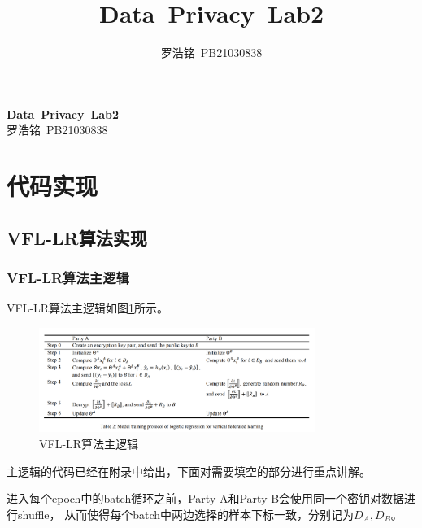 \documentclass[twoside,11pt]{article}
\title{Data\ Privacy\ Lab2}
\author{罗浩铭\ PB21030838}
\begin{document}
\fancyhf{} %
\fancyfoot[C]{\thepage} %

\renewcommand{\headrulewidth}{0pt} %

\begin{center}
    \textbf{\LARGE{Data\ Privacy\ Lab2}}\\
    \vspace{0.1cm}
    \large{罗浩铭\ PB21030838}
\end{center}



\section{代码实现}
\subsection{VFL-LR算法实现}

\subsubsection{VFL-LR算法主逻辑}

VFL-LR算法主逻辑如图\ref{fig:VFL-LR}所示。

\begin{figure}[htbp]
    \centering
    \includegraphics[width=0.8\textwidth]{pic/VFL-LR.png}
    \caption{VFL-LR算法主逻辑}
    \label{fig:VFL-LR}
\end{figure}

主逻辑的代码已经在附录中给出，下面对需要填空的部分进行重点讲解。

进入每个epoch中的batch循环之前，Party A和Party B会使用同一个密钥对数据进行shuffle，
从而使得每个batch中两边选择的样本下标一致，分别记为$D_A, D_B$。
\end{document}
